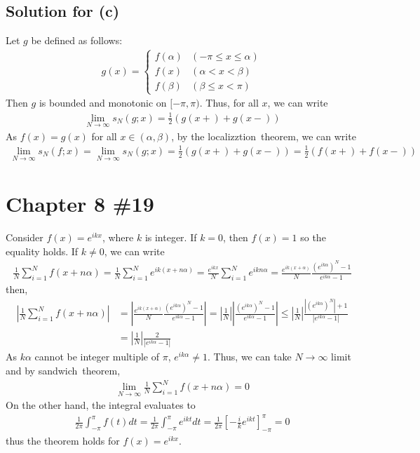 \documentclass{scrartcl}
\begin{document}
\subsection{Solution for (c)}
Let \(g\) be defined as follows:
\begin{align*}
  g(x) = \begin{cases}
    f(\alpha) & (-\pi \le x \le \alpha) \\
    f(x) & (\alpha < x < \beta) \\
    f(\beta) & (\beta \le x < \pi)
  \end{cases}
\end{align*}
Then \(g\) is bounded and monotonic on \([-\pi, \pi)\). Thus, for all \(x\), we
can write
\begin{align*}
  \lim_{N \to \infty} s_N(g; x)
  = \frac{1}{2} (g(x+) + g(x-))
\end{align*}
As \(f(x) = g(x)\) for all \(x \in (\alpha, \beta)\), by the
localizztion~theorem, we can write
\begin{align*}
  \lim_{N \to \infty} s_N(f; x)
  = \lim_{N \to \infty} s_N(g; x)
  = \frac{1}{2} (g(x+) + g(x-))
  = \frac{1}{2} (f(x+) + f(x-))
\end{align*}

\section{Chapter 8 \#19}
Consider \(f(x) = e^{ikx}\), where \(k\) is integer. If \(k = 0\), then \(f(x)
= 1\) so the equality holds. If \(k \not = 0\), we can write
\begin{align*}
  \frac{1}{N} \sum^N_{i = 1} f(x + n\alpha)
  = \frac{1}{N} \sum^N_{i = 1} e^{ik(x + n\alpha)}
  = \frac{e^{ikx}}{N} \sum^N_{i = 1} e^{ikn\alpha}
  = \frac{e^{ik(x + \alpha)}}{N} \frac{(e^{ik\alpha})^N - 1}{e^{ik\alpha} - 1}
\end{align*}
then,
\begin{align*}
  \left| \frac{1}{N} \sum^N_{i = 1} f(x + n\alpha) \right|
  &= \left| \frac{e^{ik(x + \alpha)}}{N}
    \frac{(e^{ik\alpha})^N - 1}{e^{ik\alpha} - 1} \right|
  = \left| \frac{1}{N} \right|
    \left| \frac{(e^{ik\alpha})^N - 1}{e^{ik\alpha} - 1} \right|
  \le \left| \frac{1}{N} \right|
    \frac{|(e^{ik\alpha})^N| + 1}{|e^{ik\alpha} - 1|} \\
  &= \left| \frac{1}{N} \right| \frac{2}{|e^{ik\alpha} - 1|}
\end{align*}
As \(k\alpha\) cannot be integer multiple of \(\pi\), \(e^{ik\alpha} \not =
1\). Thus, we can take \(N \to \infty\) limit and by sandwich~theorem,
\begin{align*}
  \lim_{N \to \infty} \frac{1}{N} \sum^N_{i = 1} f(x + n\alpha)
  = 0
\end{align*}
On the other hand, the integral evaluates to
\begin{align*}
  \frac{1}{2\pi} \int^\pi_{-\pi} f(t) dt
  = \frac{1}{2\pi} \int^\pi_{-\pi} e^{ikt} dt
  = \frac{1}{2\pi} \left[ -\frac{i}{k} e^{ikt} \right]^\pi_{-\pi}
  = 0
\end{align*}
thus the theorem holds for \(f(x) = e^{ikx}\).
\end{document}
